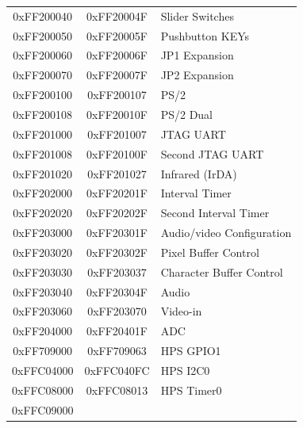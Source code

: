 \documentclass[11pt, twoside, pdftex]{article}
\begin{document}
\begin{table}[h]
\begin{center}
\begin{tabular}{c|c|l}
        \\
            0xFF200040
            & 0xFF20004F
            & Slider Switches
        \\
            0xFF200050
            & 0xFF20005F
            & Pushbutton KEYs
        \\
            0xFF200060
            & 0xFF20006F
            & JP1 Expansion
        \\
            0xFF200070
            & 0xFF20007F
            & JP2 Expansion
        \\
            0xFF200100
            & 0xFF200107
            & PS/2
        \\
            0xFF200108
            & 0xFF20010F
            & PS/2 Dual
        \\
            0xFF201000
            & 0xFF201007
            & JTAG UART
        \\
            0xFF201008
            & 0xFF20100F
            & Second JTAG UART
        \\
            0xFF201020
            & 0xFF201027
				& Infrared (IrDA)
        \\
            0xFF202000
            & 0xFF20201F
            & Interval Timer
        \\
            0xFF202020
            & 0xFF20202F
            & Second Interval Timer
        \\
            0xFF203000
            & 0xFF20301F
            & Audio/video Configuration
        \\
            0xFF203020
            & 0xFF20302F
            & Pixel Buffer Control
        \\
            0xFF203030
            & 0xFF203037
            & Character Buffer Control
        \\
            0xFF203040
            & 0xFF20304F
            & Audio
        \\
            0xFF203060
            & 0xFF203070
            & Video-in
        \\
            0xFF204000
            & 0xFF20401F
            & ADC
        \\
            0xFF709000
            & 0xFF709063
            & HPS GPIO1
        \\
            0xFFC04000
            & 0xFFC040FC
            & HPS I2C0
        \\
            0xFFC08000
            & 0xFFC08013
            & HPS Timer0
        \\
            0xFFC09000

\end{tabular}
\end{center}
\end{table}
\end{document}
